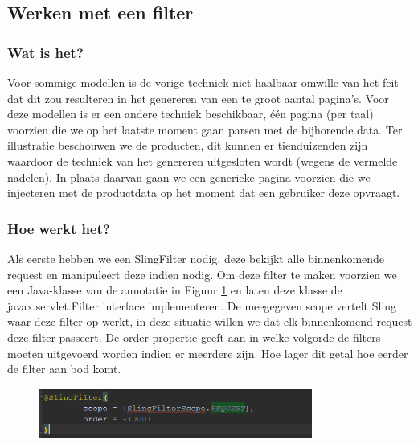 \documentclass{article}
\begin{document}
	\subsection{Werken met een filter} 
	\subsubsection{Wat is het?}
    Voor sommige modellen is de vorige techniek niet haalbaar omwille van het feit dat dit zou resulteren in het genereren van een te groot aantal pagina's. Voor deze modellen is er een andere techniek beschikbaar, \'e\'en pagina (per taal) voorzien die we op het laatste moment gaan parsen met de bijhorende data. Ter illustratie beschouwen we de producten, dit kunnen er tienduizenden zijn waardoor de techniek van het genereren uitgesloten wordt (wegens de vermelde nadelen). In plaats daarvan gaan we een generieke pagina voorzien die we injecteren met de productdata op het moment dat een gebruiker deze opvraagt. 
	\subsubsection{Hoe werkt het?}
    Als eerste hebben we een SlingFilter nodig, deze bekijkt alle binnenkomende request en manipuleert deze indien nodig. Om deze filter te maken voorzien we een Java-klasse van de annotatie in Figuur \ref{fig:sling-filter} en laten deze klasse de javax.servlet.Filter interface implementeren. De meegegeven scope vertelt Sling waar deze filter op werkt, in deze situatie willen we dat elk binnenkomend request deze filter passeert. De order propertie geeft aan in welke volgorde de filters moeten uitgevoerd worden indien er meerdere zijn. Hoe lager dit getal hoe eerder de filter aan bod komt.
    
    \begin{figure}[h!]
  		\includegraphics[width=0.8\textwidth]{images/sling-filter.PNG}
  		\label{fig:sling-filter}
	\end{figure}
	
\end{document}
